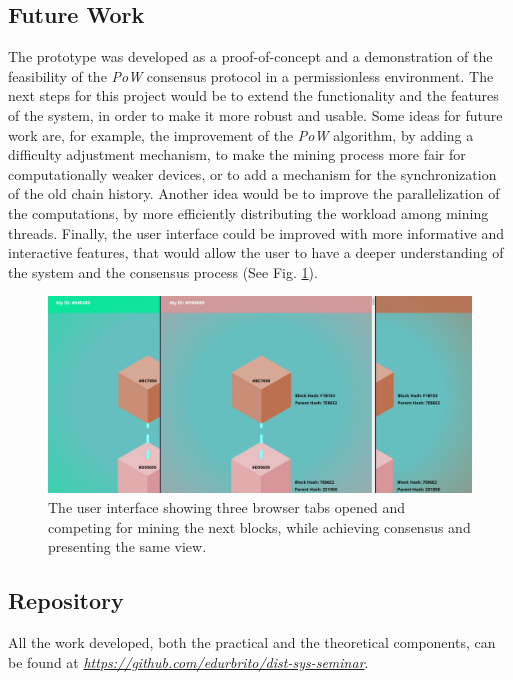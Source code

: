 \documentclass[journal]{IEEEtran}
\begin{document}
\subsection{Future Work}

The prototype was developed as a proof-of-concept and a demonstration of the feasibility
of the \emph{PoW} consensus protocol in a permissionless environment. The next steps
for this project would be to extend the functionality and the features of the system,
in order to make it more robust and usable. Some ideas for future work are, for example,
the improvement of the \emph{PoW} algorithm, by adding a difficulty adjustment mechanism,
to make the mining process more fair for computationally weaker devices, or to
add a mechanism for the synchronization of the old chain history. Another idea would be to
improve the parallelization of the computations, by more efficiently distributing the
workload among mining threads. Finally, the user interface could be improved 
with more informative and interactive features, that would allow the user to have a 
deeper understanding of the system and the consensus process (See Fig. \ref{fig:in-browser-pow}).

\begin{figure}[h]
  \centering
  \includegraphics[width=\columnwidth]{in-browser-pow}
  \caption{The user interface showing three browser tabs opened and competing for mining the next blocks, 
  while achieving consensus and presenting the same view.}
  \label{fig:in-browser-pow}
\end{figure}

\subsection{Repository}

All the work developed, both the practical and the theoretical components, can be found 
at \emph{\url{https://github.com/edurbrito/dist-sys-seminar}}.

\end{document}
